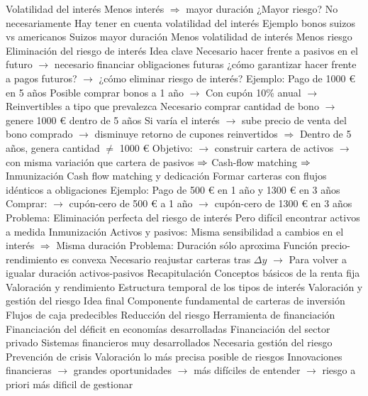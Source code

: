 \documentclass{nuevotema}
\begin{document}
\begin{esquemal}
		\2 Volatilidad del interés
			\3 Menos interés $\Rightarrow$ mayor duración
				\4 ¿Mayor riesgo?
				\4 No necesariamente
				\4 Hay tener en cuenta volatilidad del interés
			\3 Ejemplo bonos suizos vs americanos
				\4 Suizos mayor duración
				\4 Menos volatilidad de interés
				\4 Menos riesgo
		\2 Eliminación del riesgo de interés
			\3 Idea clave
				\4 Necesario hacer frente a pasivos en el futuro
				\4[] $\to$ necesario financiar obligaciones futuras
				\4 ¿cómo garantizar hacer frente a pagos futuros?
				\4[] $\to$ ¿cómo eliminar riesgo de interés?
				\4 Ejemplo:
				\4[] Pago de 1000 € en 5 años
				\4[] Posible comprar bonos a 1 año
				\4[] $\to$ Con cupón 10\% anual
				\4[] $\to$ Reinvertibles a tipo que prevalezca
				\4[] Necesario comprar cantidad de bono
				\4[] $\to$ genere 1000 € dentro de 5 años
				\4[] Si varía el interés
				\4[] $\to$ sube precio de venta del bono comprado
				\4[] $\to$ disminuye retorno de cupones reinvertidos
				\4[] $\Rightarrow$ Dentro de 5 años, genera cantidad $\neq$ 1000 €
				\4 Objetivo:
				\4[] $\to$ construir cartera de activos
				\4[] $\to$ con misma variación que cartera de pasivos
				\4[] $\Rightarrow$ Cash-flow matching
				\4[] $\Rightarrow$ Inmunización
			\3 Cash flow matching y dedicación
				\4 Formar carteras con flujos idénticos a obligaciones
				\4 Ejemplo:
				\4[] Pago de 500 € en 1 año y 1300 € en 3 años
				\4[] Comprar:
				\4[] $\to$ cupón-cero de 500 € a 1 año
				\4[] $\to$ cupón-cero de 1300 € en 3 años
				\4 Problema:
				\4[] Eliminación perfecta del riesgo de interés
				\4[] Pero difícil encontrar activos a medida
			\3 Inmunización
				\4 Activos y pasivos:
				\4[] Misma sensibilidad a cambios en el interés
				\4[] $\Rightarrow$ Misma duración
				\4 Problema:
				\4[] Duración sólo aproxima
				\4[] Función precio-rendimiento es convexa
				\4[] Necesario reajustar carteras tras $\Delta y$
				\4[] $\to$ Para volver a igualar duración activos-pasivos
	\1[] 
		\2 Recapitulación
			\3 Conceptos básicos de la renta fija
			\3 Valoración y rendimiento
			\3 Estructura temporal de los tipos de interés
			\3 Valoración y gestión del riesgo
		\2 Idea final
			\3 Componente fundamental de carteras de inversión
				\4 Flujos de caja predecibles
				\4 Reducción del riesgo
			\3 Herramienta de financiación
				\4 Financiación del déficit en economías desarrolladas
				\4 Financiación del sector privado
				\4[] Sistemas financieros muy desarrollados
			\3 Necesaria gestión del riesgo
				\4 Prevención de crisis
				\4 Valoración lo más precisa posible de riesgos
				\4 Innovaciones financieras
				\4[] $\to$ grandes oportunidades
				\4[] $\to$ más difíciles de entender
				\4[] $\to$ riesgo a priori más dificil de gestionar
\end{esquemal}
\end{document}
